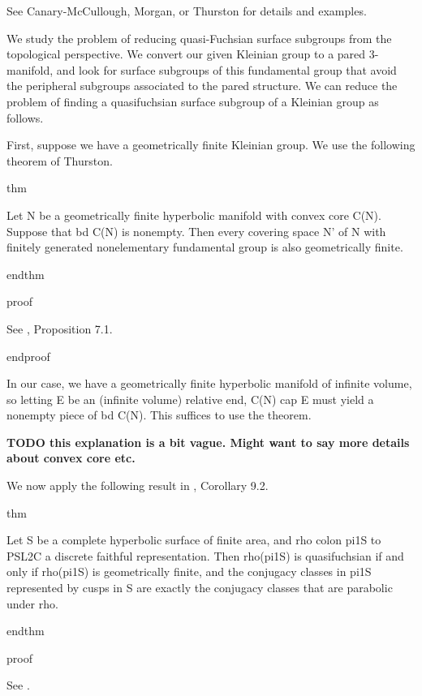 See Canary-McCullough, Morgan, or Thurston for details and examples.

We study the problem of reducing quasi-Fuchsian surface subgroups from the
topological perspective.  We convert our given Kleinian group to a pared
3-manifold, and look for surface subgroups of this fundamental group that avoid
the peripheral subgroups associated to the pared structure. We can reduce the
problem of finding a quasifuchsian surface subgroup of a Kleinian group as
follows.

First, suppose we have a geometrically finite Kleinian group. We use the
following theorem of Thurston.

thm

Let N be a geometrically finite hyperbolic manifold with convex core C(N).
Suppose that bd C(N) is nonempty. Then every covering space N' of N with
finitely generated nonelementary fundamental group is also geometrically
finite.

endthm

proof

See \cite{Mo}, Proposition 7.1.

endproof

In our case, we have a geometrically finite hyperbolic manifold of infinite
volume, so letting E be an (infinite volume) relative end, C(N) cap E must
yield a nonempty piece of bd C(N). This suffices to use the theorem.

\textbf{TODO this explanation is a bit vague. Might want to say more details
about convex core etc.}

We now apply the following result in \cite{Mo}, Corollary 9.2.

thm

Let S be a complete hyperbolic surface of finite area, and rho colon pi1S to
PSL2C a discrete faithful representation. Then rho(pi1S) is quasifuchsian if
and only if rho(pi1S) is geometrically finite, and the conjugacy classes in
pi1S represented by cusps in S are exactly the conjugacy classes that are
parabolic under rho.

endthm

proof

See \cite{Mo}.



